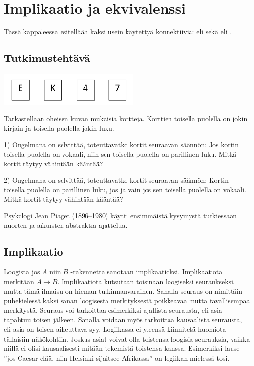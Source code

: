 
\section{Implikaatio ja ekvivalenssi}
Tässä kappaleessa esitellään kaksi usein käytettyä konnektiivia:  eli  sekä  eli .

\subsection*{Tutkimustehtävä}

\begin{center}
\includegraphics[width=7cm]{pictures/piaget}
\end{center}

Tarkastellaan oheisen kuvan mukaisia kortteja. Korttien toisella puolella on jokin kirjain ja toisella puolella jokin luku.

1) Ongelmana on selvittää, toteuttavatko kortit seuraavan säännön: Jos kortin toisella puolella on vokaali, niin sen toisella puolella on parillinen luku. Mitkä kortit täytyy vähintään kääntää?

2) Ongelmana on selvittää, toteuttavatko kortit seuraavan säännön: Kortin toisella puolella on parillinen luku, jos ja vain jos sen toisella puolella on vokaali. Mitkä kortit täytyy vähintään kääntää?

Psykologi Jean Piaget (1896--1980) käytti ensimmäistä kysymystä tutkiessaan nuorten ja aikuisten abstraktia ajattelua.

\subsection*{Implikaatio}

Loogista jos $A$ niin $B$ -rakennetta sanotaan implikaatioksi. Implikaatiota merkitään $A\to B$. Implikaatiota  kutsutaan toisinaan loogiseksi seu\-rauk\-sek\-si, mutta tämä ilmaisu on hieman tulkinnanvarainen. Sanalla seuraus on nimittäin puhekielessä kaksi sanan loogisesta merkityksestä poikkeavaa mutta tavallisempaa merkitystä. Seuraus voi tarkoittaa esimerkiksi ajallista seurausta, eli asia tapahtuu toisen jälkeen. Sanalla voidaan myös tarkoittaa kausaalista seurausta, eli asia on toisen aiheuttava syy. Logiikassa ei yleensä kiinnitetä huomiota tällaisiin näkökohtiin. Joskus asiat voivat olla toistensa loogisia seurauksia, vaikka niillä ei olisi kausaalisesti mitään tekemistä toistensa kanssa. Esimerkiksi lause ''jos Caesar elää, niin Helsinki sijaitsee Afrikassa'' on logiikan mielessä tosi. 

